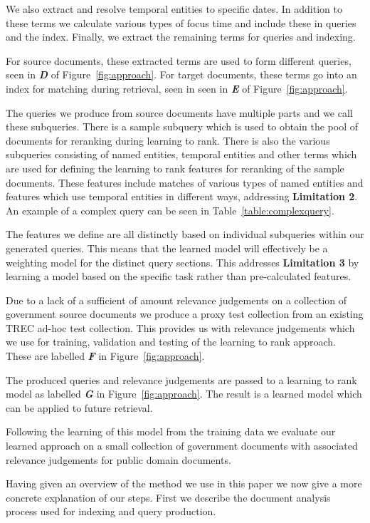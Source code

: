 \documentclass{mpaper}
\begin{document}
We also extract and resolve temporal entities to specific dates.
In addition to these terms we calculate various types of focus time and include these in queries and the index.
Finally, we extract the remaining terms for queries and indexing.

For source documents, these extracted terms are used to form different queries, seen in \textbf{\textit{D}} of Figure~\ref{fig:approach}.
For target documents, these terms go into an index for matching during retrieval, seen in seen in \textbf{\textit{E}} of Figure~\ref{fig:approach}.

The queries we produce from source documents have multiple parts and we call these subqueries.
There is a sample subquery which is used to obtain the pool of documents for reranking during learning to rank.
There is also the various subqueries consisting of named entities, temporal entities and other terms which are used for defining the learning to rank features for reranking of the sample documents.
These features include matches of various types of named entities and features which use temporal entities in different ways, addressing \textbf{Limitation 2}. An example of a complex query can be seen in Table~\ref{table:complexquery}.

The features we define are all distinctly based on individual subqueries within our generated queries. This means that the learned model will effectively be a weighting model for the distinct query sections. This addresses \textbf{Limitation 3} by learning a model based on the specific task rather than pre-calculated features.

Due to a lack of a sufficient of amount relevance judgements on a collection of government source documents we produce a proxy test collection from an existing TREC ad-hoc test collection. This provides us with relevance judgements which we use for training, validation and testing of the learning to rank approach. These are labelled \textbf{\textit{F}} in Figure~\ref{fig:approach}.

The produced queries and relevance judgements are passed to a learning to rank model as labelled \textbf{\textit{G}} in Figure~\ref{fig:approach}. The result is a learned model which can be applied to future retrieval. 

Following the learning of this model from the training data we evaluate our learned approach on a small collection of government documents with associated relevance judgements for public domain documents.

Having given an overview of the method we use in this paper we now give a more concrete explanation of our steps. First we describe the document analysis process used for indexing and query production.
\end{document}

